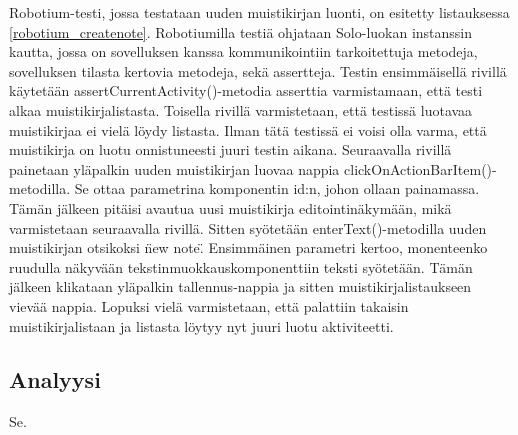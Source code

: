 Robotium-testi, jossa testataan uuden muistikirjan luonti, on esitetty listauksessa \ref{robotium_createnote}. Robotiumilla testiä ohjataan Solo-luokan instanssin kautta, jossa on sovelluksen kanssa kommunikointiin tarkoitettuja metodeja, sovelluksen tilasta kertovia metodeja, sekä assertteja. Testin ensimmäisellä rivillä käytetään assertCurrentActivity()-metodia asserttia varmistamaan, että testi alkaa muistikirjalistasta. Toisella rivillä varmistetaan, että testissä luotavaa muistikirjaa ei vielä löydy listasta. Ilman tätä testissä ei voisi olla varma, että muistikirja on luotu onnistuneesti juuri testin aikana. Seuraavalla rivillä painetaan yläpalkin uuden muistikirjan luovaa nappia clickOnActionBarItem()-metodilla. Se ottaa parametrina komponentin id:n, johon ollaan painamassa. Tämän jälkeen pitäisi avautua uusi muistikirja editointinäkymään, mikä varmistetaan seuraavalla rivillä. Sitten syötetään enterText()-metodilla uuden muistikirjan otsikoksi \"new note\". Ensimmäinen parametri kertoo, monenteenko ruudulla näkyvään tekstinmuokkauskomponenttiin teksti syötetään. Tämän jälkeen klikataan yläpalkin tallennus-nappia ja sitten muistikirjalistaukseen vievää nappia. Lopuksi vielä varmistetaan, että palattiin takaisin muistikirjalistaan ja listasta löytyy nyt juuri luotu aktiviteetti.

\subsection{Analyysi}

Se.